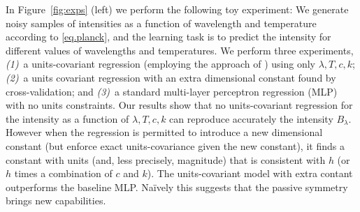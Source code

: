 \documentclass[preprint]{article} %
\newcommand{\figref}[1]{Figure~\ref{#1}}
\begin{document}
In \figref{fig:exps} (left) we perform the following toy experiment:
We generate noisy samples of intensities as a function of wavelength and temperature according to \eqref{eq.planck}, and the learning task is to predict the intensity for different values of wavelengths and temperatures.
We perform three experiments,
\textsl{(1)}~a units-covariant regression (employing the approach of \citealt{villar2022dimensionless}) using only $\lambda, T, c, k$; \textsl{(2)}~a units covariant regression with an extra dimensional constant found by cross-validation; and \textsl{(3)}~a standard multi-layer perceptron regression (MLP) with no units constraints.
Our results show that no units-covariant regression for the intensity as a function of $\lambda, T, c, k$ can reproduce accurately the intensity $B_\lambda$.
However when the regression is permitted to introduce a new dimensional constant (but enforce exact units-covariance given the new constant), it finds a constant with units (and, less precisely, magnitude) that is consistent with $h$ (or $h$ times a combination of $c$ and $k$).
The units-covariant model with extra contant outperforms the baseline MLP.
Na\"ively this suggests that the passive symmetry brings new capabilities.
\end{document}

